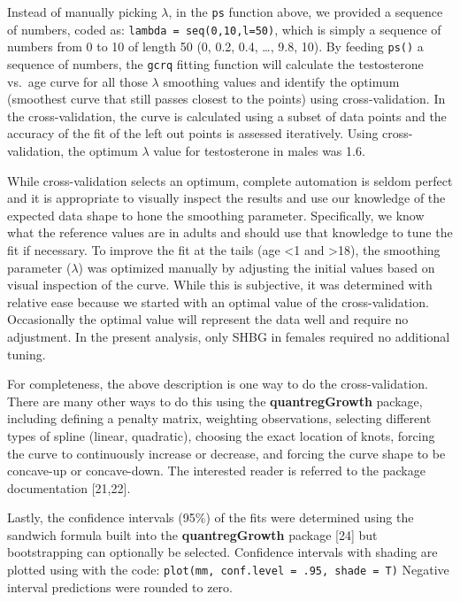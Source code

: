 \documentclass[]{elsarticle} %
\begin{document}
Instead of manually picking \(\lambda\), in the \texttt{ps} function
above, we provided a sequence of numbers, coded as:
\texttt{lambda\ =\ seq(0,10,l=50)}, which is simply a sequence of
numbers from 0 to 10 of length 50 (0, 0.2, 0.4, \ldots, 9.8, 10). By
feeding \texttt{ps()} a sequence of numbers, the \texttt{gcrq} fitting
function will calculate the testosterone vs.~age curve for all those
\(\lambda\) smoothing values and identify the optimum (smoothest curve
that still passes closest to the points) using cross-validation. In the
cross-validation, the curve is calculated using a subset of data points
and the accuracy of the fit of the left out points is assessed
iteratively. Using cross-validation, the optimum \(\lambda\) value for
testosterone in males was 1.6.

While cross-validation selects an optimum, complete automation is seldom
perfect and it is appropriate to visually inspect the results and use
our knowledge of the expected data shape to hone the smoothing
parameter. Specifically, we know what the reference values are in adults
and should use that knowledge to tune the fit if necessary. To improve
the fit at the tails (age \textless1 and \textgreater18), the smoothing
parameter (\(\lambda\)) was optimized manually by adjusting the initial
values based on visual inspection of the curve. While this is
subjective, it was determined with relative ease because we started with
an optimal value of the cross-validation. Occasionally the optimal value
will represent the data well and require no adjustment. In the present
analysis, only SHBG in females required no additional tuning.

For completeness, the above description is one way to do the
cross-validation. There are many other ways to do this using the
\textbf{quantregGrowth} package, including defining a penalty matrix,
weighting observations, selecting different types of spline (linear,
quadratic), choosing the exact location of knots, forcing the curve to
continuously increase or decrease, and forcing the curve shape to be
concave-up or concave-down. The interested reader is referred to the
package documentation {[}21,22{]}.

Lastly, the confidence intervals (95\%) of the fits were determined
using the sandwich formula built into the \textbf{quantregGrowth}
package {[}24{]} but bootstrapping can optionally be selected.
Confidence intervals with shading are plotted using with the code:
\texttt{plot(mm,\ conf.level\ =\ .95,\ shade\ =\ T)} Negative interval
predictions were rounded to zero.
\end{document}
